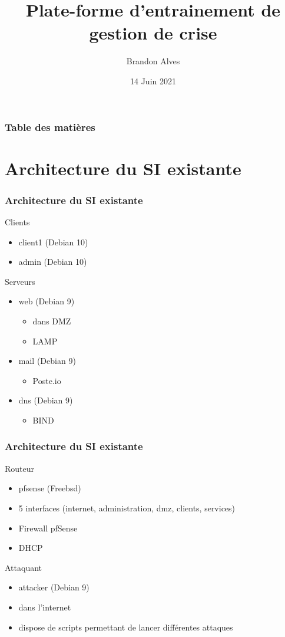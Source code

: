 \documentclass{beamer}
\title[État des lieux]{Plate-forme d'entrainement de gestion de crise}
\author{Brandon Alves}
\institute[INSA Lyon]{
	INSA Lyon \\
	\medskip
	INRIA
}
\date{14 Juin 2021}
\begin{document}
	\begin{frame}
		\titlepage
	\end{frame}
	\begin{frame}
		\frametitle{Table des matières}
		\tableofcontents
	\end{frame}
	\section{Architecture du SI existante}
		\begin{frame}
			\frametitle{Architecture du SI existante}
			\begin{block}{Clients}
				\begin{itemize}
					\item client1 (Debian 10)
					\item admin (Debian 10)
				\end{itemize}
			\end{block}
			\begin{block}{Serveurs}
				\begin{itemize}
					\item web (Debian 9)
					\begin{itemize}
						\item dans DMZ
						\item LAMP
					\end{itemize}
					\item mail (Debian 9)
					\begin{itemize}
						\item Poste.io
					\end{itemize}
					\item dns (Debian 9)
					\begin{itemize}
						\item BIND
					\end{itemize}
				\end{itemize}
			\end{block}
		\end{frame}
		\begin{frame}
			\frametitle{Architecture du SI existante}
			\begin{block}{Routeur}
				\begin{itemize}
					\item pfsense (Freebsd)
					\item 5 interfaces (internet, administration, dmz, clients, services)
					\item Firewall pfSense
					\item DHCP
				\end{itemize}
			\end{block}
			\begin{block}{Attaquant}
				\begin{itemize}
					\item attacker (Debian 9)
					\item dans l'internet
					\item dispose de scripts permettant de lancer différentes attaques
				\end{itemize}
			\end{block}
		\end{frame}
\end{document}
